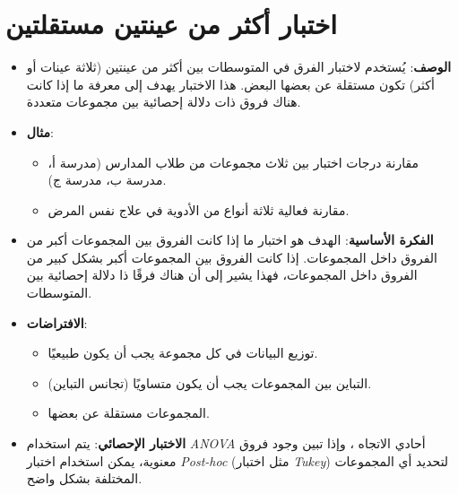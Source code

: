 	\section{اختبار أكثر من عينتين مستقلتين }
	\begin{itemize}
		\item \textbf{الوصف}: يُستخدم لاختبار الفرق في المتوسطات بين أكثر من عينتين (ثلاثة عينات أو أكثر) تكون مستقلة عن بعضها البعض. هذا الاختبار يهدف إلى معرفة ما إذا كانت هناك فروق ذات دلالة إحصائية بين مجموعات متعددة.
		\item \textbf{مثال}:
		\begin{itemize}
			\item مقارنة درجات اختبار بين ثلاث مجموعات من طلاب المدارس (مدرسة أ، مدرسة ب، مدرسة ج).
			\item مقارنة فعالية ثلاثة أنواع من الأدوية في علاج نفس المرض.
		\end{itemize}
		\item \textbf{الفكرة الأساسية}: الهدف هو اختبار ما إذا كانت الفروق بين المجموعات أكبر من الفروق داخل المجموعات. إذا كانت الفروق بين المجموعات أكبر بشكل كبير من الفروق داخل المجموعات، فهذا يشير إلى أن هناك فرقًا ذا دلالة إحصائية بين المتوسطات.
		\item \textbf{الافتراضات}:
		\begin{itemize}
			\item توزيع البيانات في كل مجموعة يجب أن يكون طبيعيًا.
			\item التباين بين المجموعات يجب أن يكون متساويًا (تجانس التباين).
			\item المجموعات مستقلة عن بعضها.
		\end{itemize}
		\item \textbf{الاختبار الإحصائي}: يتم استخدام \textit{ANOVA} أحادي الاتجاه ، وإذا تبين وجود فروق معنوية، يمكن استخدام اختبار \textit{Post-hoc} (مثل اختبار \textit{Tukey}) لتحديد أي المجموعات المختلفة بشكل واضح.
	\end{itemize}
	
